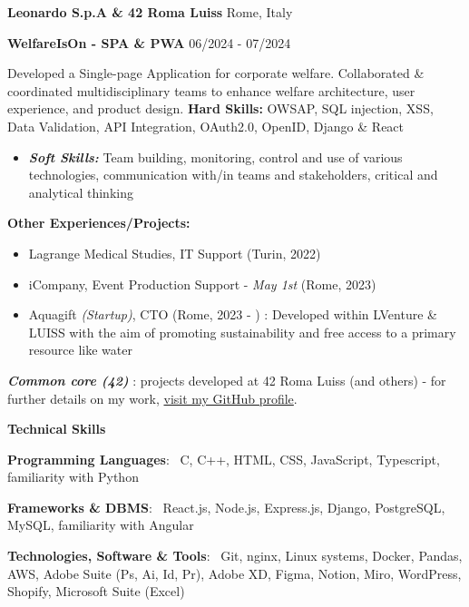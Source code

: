 \documentclass[11pt]{article}
\begin{document}
\vspace{12pt}

\textbf{Leonardo S.p.A \&  42 Roma Luiss} \hfill Rome, Italy

\textbf{WelfareIsOn - SPA \& PWA } \hfill 06/2024 - 07/2024

Developed a Single-page Application for corporate welfare. Collaborated \& coordinated multidisciplinary teams to enhance welfare architecture, user experience, and product design.
\textbf{Hard Skills:} OWSAP, SQL injection, XSS, Data Validation, API Integration, OAuth2.0, OpenID, Django \& React
\begin{itemize}
    \item \textbf{\textit{Soft Skills:}} Team building, monitoring, control and use of various technologies, communication with/in teams and stakeholders, critical and analytical thinking
\end{itemize}

\vspace{12pt}

\textbf{Other Experiences/Projects:}
\begin{itemize}[noitemsep,topsep=0pt]
    \item Lagrange Medical Studies, IT Support (Turin, 2022)
    \item iCompany, Event Production Support - \textit{May 1st} (Rome, 2023)
    \item Aquagift \textit{(Startup)}, CTO (Rome, 2023 - ) : Developed within LVenture \& LUISS with the aim of promoting sustainability and free access to a primary resource like water
    \end{itemize}

\textit{\textbf{Common core (42)}} : projects developed at 42 Roma Luiss (and others) - for further details on my work, \href{https://github.com/amema42}{visit my GitHub profile}.

\vspace{12pt}

\begin{center}
    \textbf{Technical Skills}
\end{center}

\textbf{Programming Languages}: \
C, C++, HTML, CSS, JavaScript, Typescript, familiarity with Python

\textbf{Frameworks \& DBMS}: \
React.js, Node.js, Express.js, Django, PostgreSQL, MySQL, familiarity with Angular

\textbf{Technologies, Software \& Tools}: \
Git, nginx, Linux systems, Docker, Pandas, AWS, Adobe Suite (Ps, Ai, Id, Pr), Adobe XD, Figma, Notion, Miro, WordPress, Shopify, Microsoft Suite (Excel)
\end{document}
